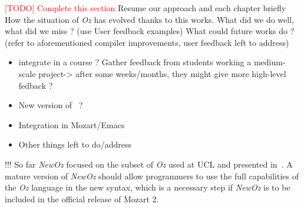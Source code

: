
\textcolor{red}{[TODO] Complete this section}
Resume our approach and each chapter briefly
How the situation of \textit{Oz} has evolved thanks to this works.\newline
What did we do well, what did we miss ? (use User feedback examples)\newline
What could future works do ? (refer to aforementioned compiler improvements, user feedback left to address)\newline
\begin{itemize}
    \item integrate in a course ? Gather feedback from students working a medium-scale project-> after some weeks/months, they might give more high-level fedback ?
    \item New version of~\cite{van2004concepts} ?
    \item Integration in Mozart/Emacs
    \item Other things left to do/address
\end{itemize}

!!! So far \textit{NewOz} focused on the subset of \textit{Oz} used at UCL and presented in~\cite{van2004concepts}.
A mature version of \textit{NewOz} should allow programmers to use the full capabilities of the \textit{Oz} language in the new syntax, which is a necessary step if \textit{NewOz} is to be included in the official release of Mozart 2.